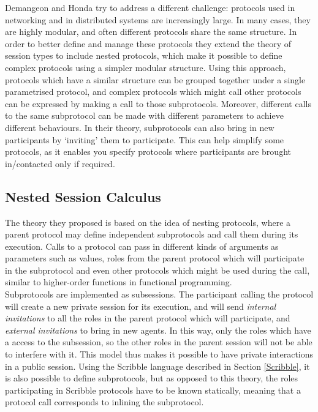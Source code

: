 \documentclass[12pt,twoside]{report}
\begin{document}
Demangeon and Honda \cite{nestedprotocols} try to address a different challenge: protocols used in networking and in distributed systems are increasingly large. In many cases, they are highly modular, and often different protocols share the same structure. In order to better define and manage these protocols they extend the theory of session types to include nested protocols, which make it possible to define complex protocols using a simpler modular structure. Using this approach, protocols which have a similar structure can be grouped together under a single parametrised protocol, and complex protocols which might call other protocols can be expressed by making a call to those subprotocols. Moreover, different calls to the same subprotocol can be made with different parameters to achieve different behaviours. In their theory, subprotocols can also bring in new participants by `inviting' them to participate. This can help simplify some protocols, as it enables you specify protocols where participants are brought in/contacted only if required.

\subsection{Nested Session Calculus}
The theory they proposed is based on the idea of nesting protocols, where a parent protocol may define independent subprotocols and call them during its execution. Calls to a protocol can pass in different kinds of arguments as parameters such as values, roles from the parent protocol which will participate in the subprotocol and even other protocols which might be used during the call, similar to higher-order functions in functional programming.\\ 

Subprotocols are implemented as subsessions. The participant calling the protocol will create a new private session for its execution, and will send \textit{internal invitations} to all the roles in the parent protocol which will participate, and \textit{external invitations} to bring in new agents. In this way, only the roles which have a access to the subsession, so the other roles in the parent session will not be able to interfere with it. This model thus makes it possible to have private interactions in a public session. Using the Scribble language described in Section \ref{Scribble}, it is also possible to define subprotocols, but as opposed to this theory, the roles participating in Scribble protocols have to be known statically, meaning that a protocol call corresponds to inlining the subprotocol.\\
\end{document}
